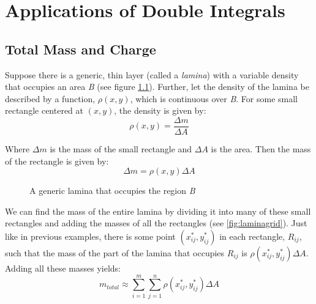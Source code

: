 \chapter{Applications of Double Integrals}

\section{Total Mass and Charge}
Suppose there is a generic, thin layer (called a \textit{lamina}) with a 
variable density that occupies an area \textit{B} (see figure \ref{fig:lamina}).
Further, let the density of the lamina be described by a function, $\rho 
(x, y)$, which is continuous over \textit{B}. For some small rectangle centered
at $(x, y)$, the density is given by:
$$\rho (x, y) = \frac{\Delta m}{\Delta A}$$

Where $\Delta m$ is the mass of the small rectangle and $\Delta A$ is the area.
Then the mass of the rectangle is given by:
$$\Delta m = \rho (x, y) \Delta A$$

\begin{figure}[htbp]
\centering
    \caption{A generic lamina that occupies the region \textit{B}}
    \label{fig:lamina}
\end{figure}

We can find the mass of the entire lamina by dividing it into many of these 
small rectangles and adding the masses of all the rectangles (see 
\ref{fig:laminagrid}). Just like in previous examples, there is some point 
$(x_{ij}^*, y_{ij}^*)$ in each rectangle, $R_{ij}$, such that the mass of the 
part of the lamina that occupies $R_{ij}$ is $\rho (x_{ij}^*, y_{ij}^*) \Delta 
A$. Adding all these masses yields:
$$m_{total} \approx \sum_{i = 1}^m \sum_{j = 1}^n \rho (x_{ij}^*, y_{ij}^*) 
\Delta A$$

